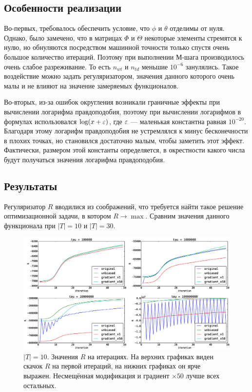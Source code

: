\documentclass[12pt, twoside]{article}
\begin{document}
\subsection{Особенности реализации}
\label{technical}
Во-первых, требовалось обеспечить условие, что $\phi$ и $\theta$ отделимы от нуля. Однако, было замечено, что в матрицах $\Phi$ и $\Theta$ некоторые элементы стремятся к нулю, но обнуляются посредством машинной точности только спустя очень большое количество итераций. Поэтому при выполнении М-шага производилось очень слабое разреживание. То есть  $n_{wt}$ и $n_{td}$ меньшие $10^{-6}$ занулялись. Такое воздействие можно задать регуляризатором, значения данного которого очень малы и не влияют на значение замеряемых функционалов.

Во-вторых, из-за ошибок округления возникали граничные эффекты при вычислении логарифма правдоподобия, поэтому при вычислении логарифмов в формулах использовался $\log(x + \varepsilon)$, где $\varepsilon$ ---  маленькая константна равная $10^{-20}$. Благодаря этому логарифм правдоподобия не устремлялся к минус бесконечности в плохих точках, но становился достаточно малым, чтобы заметить этот эффект. Фактически, размером этой константы определяется, в окрестности какого числа будут получаться  значения логарифма правдоподобия.
\subsection{Результаты}

Регуляризатор $R$  вводилися из соображений, что требуется найти такое решение оптимизационной задачи, в котором $R \to \max$. Сравним значения данного функционала при $|T| = 10$ и $|T| = 30$.

\begin{figure}[!ht]
	\centering
	\includegraphics[width=1.0\linewidth]{paper_pictures/topics_10_R_values}
	\caption{$|T| = 10$. Значения $R$ на итерациях. На верхних графиках виден скачок $R$ на первой итераций, на нижних графиках он ярче выражен. Несмещённая модификация и градиент $\times 50$  лучше всех остальных.}
\end{figure}
\end{document}
